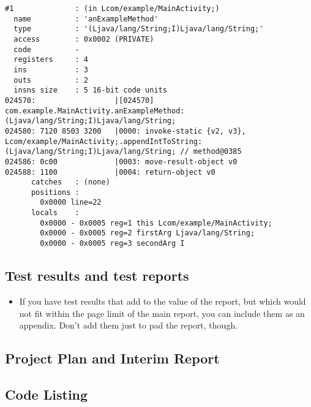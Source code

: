 \begin{lstlisting}
#1              : (in Lcom/example/MainActivity;)
  name          : 'anExampleMethod'
  type          : '(Ljava/lang/String;I)Ljava/lang/String;'
  access        : 0x0002 (PRIVATE)
  code          -
  registers     : 4
  ins           : 3
  outs          : 2
  insns size    : 5 16-bit code units
024570:                  |[024570] com.example.MainActivity.anExampleMethod:(Ljava/lang/String;I)Ljava/lang/String;
024580: 7120 8503 3200   |0000: invoke-static {v2, v3}, Lcom/example/MainActivity;.appendIntToString:(Ljava/lang/String;I)Ljava/lang/String; // method@0385
024586: 0c00             |0003: move-result-object v0
024588: 1100             |0004: return-object v0
      catches   : (none)
      positions :
        0x0000 line=22
      locals    :
        0x0000 - 0x0005 reg=1 this Lcom/example/MainActivity;
        0x0000 - 0x0005 reg=2 firstArg Ljava/lang/String;
        0x0000 - 0x0005 reg=3 secondArg I
\end{lstlisting}


\subsection{Test results and test reports}

\begin{mdframed}
	\begin{itemize}
		\item If you have test results that add to the value of the report, but which would not fit within the page limit of the main report, you can include them as an appendix. Don't add them just to pad the report, though.
	\end{itemize}
\end{mdframed}

\subsection{Project Plan and Interim Report}





\subsection{Code Listing}

